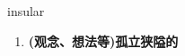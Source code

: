 
\begin{frame}
{\huge insular}
\begin{center}
\begin{enumerate}\Large
  \item \textbf{(观念、想法等)孤立狭隘的}
\end{enumerate}
\end{center}
\end{frame}
